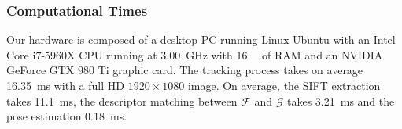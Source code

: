 \subsubsection{Computational Times}
Our hardware is composed of a desktop PC running Linux Ubuntu with an Intel Core i$7$-$5960$X CPU running at \SI{3.00}{\giga\hertz} with \SI{16}{\giga\byte} of RAM and an NVIDIA GeForce GTX $980$ Ti graphic card.
The tracking process takes on average \SI{16.35}{\milli\second} with a full HD $1920\times1080$ image.
On average, the SIFT extraction takes \SI{11.1}{\milli\second}, the descriptor matching between $\mathcal{F}$ and $\mathcal{G}$ takes \SI{3.21}{\milli\second}  and the pose estimation \SI{0.18}{\milli\second}.





